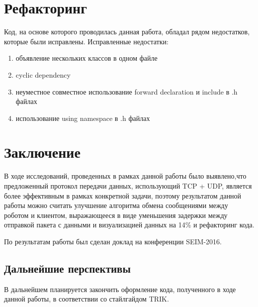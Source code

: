 \documentclass[14pt]{matmex-diploma-custom.cls}
\begin{document}
\section{Рефакторинг}
Код, на основе которого проводилась данная работа, обладал рядом недостатков, которые были исправлены.
Исправленные недостатки:
\begin{enumerate}
\item объявление нескольких классов в одном файле
\item cyclic dependency
\item неуместное совместное использование forward declaration и include в .h файлах 
\item использование using namespace в .h файлах
\end{enumerate}


\section*{Заключение}
В ходе исследований, проведенных в рамках данной работы было выявлено,что предложенный протокол передачи данных, использующий TCP + UDP, является более эффективным в рамках конкретной задачи, поэтому результатом данной работы можно считать улучшение алгоритма обмена сообщениями между роботом и клиентом, выражающееся в виде уменьшения задержки между отправкой пакета с данными и визуализацией данных на 14\% и рефакторинг кода.

По результатам работы был сделан доклад на конференции SEIM-2016.

\subsection*{Дальнейшие перспективы}
В дальнейшем планируется закончить оформление кода, полученного в ходе данной работы, в соответствии со стайлгайдом \cite{guide} TRIK.

\setmonofont[Mapping=tex-text]{CMU Typewriter Text}


\end{document}
